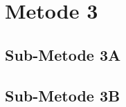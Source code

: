     \lipsum[7-9]

\section{Metode 3}
\label{sec:Metode_03}

    \lipsum[10-12]
    
    \subsection{Sub-Metode 3A}
    \label{subsec:Sub-Metode_03A}
    
    \lipsum[13-15]
    
    \subsection{Sub-Metode 3B}
    \label{subsec:Sub-Metode_03B}
    
    \lipsum[15-18]
